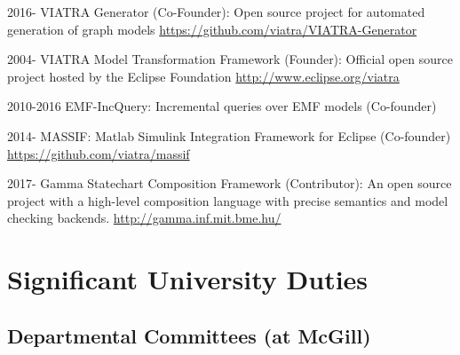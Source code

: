 \begin{yearlist}
\item[2016-] VIATRA Generator (Co-Founder): Open source project for automated generation of graph models \newline \url{https://github.com/viatra/VIATRA-Generator} 

\item[2004-] VIATRA Model Transformation Framework (Founder): Official open source project hosted by the Eclipse Foundation \newline \url{http://www.eclipse.org/viatra} 

\item[2010-2016] EMF-IncQuery: Incremental queries over EMF models (Co-founder) 

\item[2014-] MASSIF: Matlab Simulink Integration Framework for Eclipse (Co-founder) \newline 
\url{https://github.com/viatra/massif} 

\item[2017-] Gamma Statechart Composition Framework (Contributor): An open source project with a high-level composition language with precise semantics and model checking backends. \newline \url{http://gamma.inf.mit.bme.hu/} 

\end{yearlist}

\newpage 

\section{Significant University Duties}

\subsection{Departmental Committees (at McGill)}

